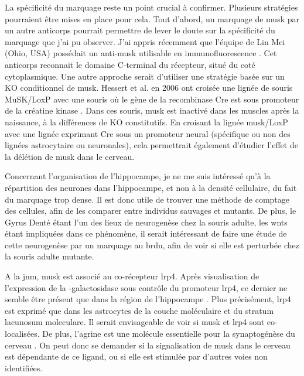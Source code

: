 La spécificité du marquage reste un point crucial à confirmer. Plusieurs stratégies pourraient être mises en place pour cela. Tout d'abord, un marquage de \gls{musk} par un autre anticorps pourrait permettre de lever le doute sur la spécificité du marquage que j'ai pu observer. J'ai appris récemment que l'équipe de Lin Mei (Ohio, USA) possédait un anti-\gls{musk} utilisable en immunofluorescence \cite{Amenta2012}. Cet anticorps reconnait le domaine C-terminal du récepteur, situé du coté cytoplasmique. Une autre approche serait d'utiliser une stratégie basée sur un KO conditionnel de \gls{musk}. Hessert et al. en 2006 ont croisée une lignée de souris MuSK/LoxP avec une souris où le gène de la recombinase Cre est sous promoteur de la créatine kinase \cite{Hesser2006}. Dans ces souris, \gls{musk} est inactivé dans les muscles après la naissance, à la différences de KO constitutifs. En croisant la lignée \gls{musk}/LoxP avec une lignée exprimant Cre sous un promoteur neural (spécifique ou non des lignées astrocytaire ou neuronales), cela permettrait également d'étudier l'effet de la délétion de \gls{musk} dans le cerveau.

Concernant l'organisation de l'hippocampe, je ne me suis intéressé qu'à la répartition des neurones dans l'hippocampe, et non à la densité cellulaire, du fait du marquage trop dense. Il est donc utile de trouver une méthode de comptage des cellules, afin de les comparer entre individus sauvages et mutants. De plus, le Gyrus Denté étant l'un des lieux de neurogenèse chez la souris adulte, les \Glspl{wnt} étant impliquées dans ce phénomène, il serait intéressant de faire une étude de cette neurogenèse par un marquage au \gls{brdu}, afin de voir si elle est perturbée chez la souris adulte mutante.

A la \gls{jnm}, \gls{musk} est associé au co-récepteur \gls{lrp}4. Après visualisation de l'expression de la \textbeta{}-galactosidase sous contrôle du promoteur \gls{lrp}4, ce dernier ne semble être présent que dans la région de l'hippocampe \cite{Sun2016}. Plus précisément, \gls{lrp}4 est exprimé que dans les astrocytes de la couche moléculaire et du stratum lacunosum moleculare. Il serait envisageable de voir si \gls{musk} et \gls{lrp}4 sont co-localisées. De plus, l'agrine est une molécule essentielle pour la synaptogénèse du cerveau \cite{Cohen1997, Bose2000, Sun2016}. On peut donc se demander si la signalisation de \gls{musk} dans le cerveau est dépendante de ce ligand, ou si elle est stimulée par d'autres voies non identifiées.

